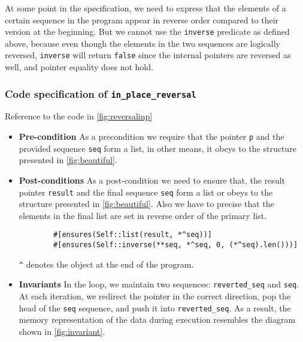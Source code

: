 \documentclass[11pt,a4paper]{article}
\begin{document}
\begin{itemize}
    At some point in the specification, we need to express that the elements of a certain sequence in the program appear in reverse order compared to their version at the beginning. But we cannot use the \texttt{inverse} predicate as defined above, because even though the elements in the two sequences are logically reversed, \texttt{inverse} will return \texttt{false} since the internal pointers are reversed as well, and pointer equality does not hold.
  \end{itemize}
  
\subsubsection{Code specification of \texttt{in\_place\_reversal}}
Reference to the code in \autoref{fig:reversalinp}
\begin{itemize}
    \item \textbf{Pre-condition}
    As a precondition we require that the pointer \texttt{p} and the provided sequence \texttt{seq} form a list, in other means, it obeys to the structure presented in \autoref{fig:beautiful}.
    \item \textbf{Post-conditions}
    As a post-condition we need to ensure that, the result pointer \texttt{result} and the final sequence \texttt{seq} form a list or obeys to the structure presented in \autoref{fig:beautiful}.
    Also we have to precise that the elements in the final list are set in reverse order of the primary list.
    \begin{verbatim}
        #[ensures(Self::list(result, *^seq))]
        #[ensures(Self::inverse(**seq, *^seq, 0, (*^seq).len()))]
    \end{verbatim}
    \texttt{\^{}} denotes the object at the end of the program.
    \item \textbf{Invariants}
    In the loop, we maintain two sequences: \texttt{reverted\_seq} and \texttt{seq}. At each iteration, we redirect the pointer in the correct direction, pop the head of the \texttt{seq} sequence, and push it into \texttt{reverted\_seq}. As a result, the memory representation of the data during execution resembles the diagram shown in \autoref{fig:invariant}.

      \begin{figure}[tp]
    \centering
\end{figure}
\end{itemize}
\end{document}
